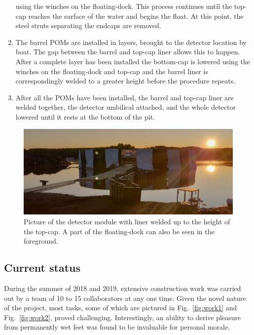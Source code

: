 \begin{enumerate}
          using the winches on the floating-dock. This process continues until the top-cap reaches
          the surface of the water and begins the float. At this point, the steel struts
          separating the endcaps are removed.
    \item The barrel POMs are installed in layers, brought to the detector location by boat. The
          gap between the barrel and top-cap liner allows this to happen. After a complete layer
          has been installed the bottom-cap is lowered using the winches on the floating-dock and
          top-cap and the barrel liner is correspondingly welded to a greater height before the
          procedure repeats.
    \item After all the POMs have been installed, the barrel and top-cap liner are welded
          together, the detector umbilical attached, and the whole detector lowered until it rests
          at the bottom of the pit.
\end{enumerate}

\begin{figure} %
    \includegraphics[width=\textwidth]{diagrams/4-chips/chips_with_liner_sun.pdf}
    \caption[Picture of the \chipsfive detector module with liner]
    {Picture of the \chipsfive detector module with liner welded up to the height of the top-cap.
        A part of the floating-dock can also be seen in the foreground.}
    \label{fig:chips_with_liner}
\end{figure}

\subsection{Current status} %
\label{sec:chips_detector_status} %

During the summer of 2018 and 2019, extensive \chipsfive construction work was carried out by a
team of 10 to 15 collaborators at any one time. Given the novel nature of the project, most tasks,
some of which are pictured in Fig.~\ref{fig:work1} and Fig.~\ref{fig:work2}, proved challenging.
Interestingly, an ability to derive pleasure from permanently wet feet was found to be invaluable
for personal morale.

